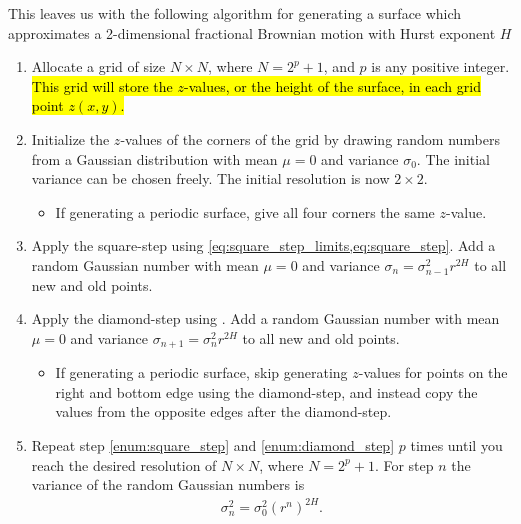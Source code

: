 This leaves us with the following algorithm for generating a surface which approximates a 2-dimensional fractional Brownian motion with Hurst exponent $H$
\begin{enumerate}
    \renewcommand{\labelitemii}{$\bullet$}
    
    \item Allocate a grid of size $N\times N$, where $N = 2^p + 1$, and $p$ is any positive integer. \hl{This grid will store the $z$-values, or the height of the surface, in each grid point $z(x,y)$.}

    \item Initialize the $z$-values of the corners of the grid by drawing random numbers from a Gaussian distribution with mean $\mu = 0$ and variance $\sigma_0$. The initial variance can be chosen freely. The initial resolution is now $2\times 2$.
    \begin{itemize}
        \item If generating a periodic surface, give all four corners the same $z$-value.
    \end{itemize}
    
    \item Apply the square-step using \cref{eq:square_step_limits,eq:square_step}. Add a random Gaussian number with mean $\mu = 0$ and variance $\sigma_n = \sigma_{n-1}^2r^{2H}$ to all new and old points.
    \label{enum:square_step}

    \item Apply the diamond-step using . Add a random Gaussian number with mean $\mu = 0$ and variance $\sigma_{n+1} = \sigma_n^2r^{2H}$ to all new and old points.
    \label{enum:diamond_step}
    
    \begin{itemize}
        \item If generating a periodic surface, skip generating $z$-values for points on the right and bottom edge using the diamond-step, and instead copy the values from the opposite edges after the diamond-step.
    \end{itemize}
    
    \item Repeat step \ref{enum:square_step} and \ref{enum:diamond_step} $p$ times until you reach the desired resolution of $N\times N$, where $N = 2^p + 1$. For step $n$ the variance of the random Gaussian numbers is
    \begin{align*}
        \sigma_n^2 = \sigma_0^2(r^n)^{2H}.
    \end{align*}
\end{enumerate}

